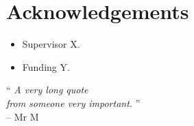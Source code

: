 \chapter*{Acknowledgements}
\makeatletter{}\makeatother

\begin{itemize}
	\item Supervisor X.
	\item Funding Y.
\end{itemize}
\begin{centering}
{\LARGE``} \textit{A very long quote}\\
\textit{from someone very important.} {\LARGE''}\\
-- Mr M\\


\vfill



\end{centering}